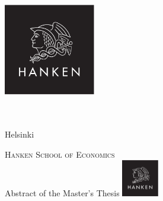 \documentclass[12pt, a4paper, oneside]{article}
\begin{document}


\begin{titlepage}
    \centering
    \includegraphics[width=4cm]{hanken_logo_platta}

    \vspace{2cm}

    {\LARGE \scshape \thesistitle \par}

    \vspace{2cm}

    {\Large \thesisauthor \par}
    \vfill
    {
        \normalsize
        \department \\
        \school \\
        Helsinki \\
        \the\year \par
    }
\end{titlepage}

\cleardoublepage



\setcounter{page}{1}

{}

{\LARGE \scshape Hanken School of Economics} \\ [-6mm]
{\Large Abstract of the Master's Thesis \hfill \includegraphics[width=1.6cm]{hanken_logo_platta}} \\ [-4mm]
\end{document}
